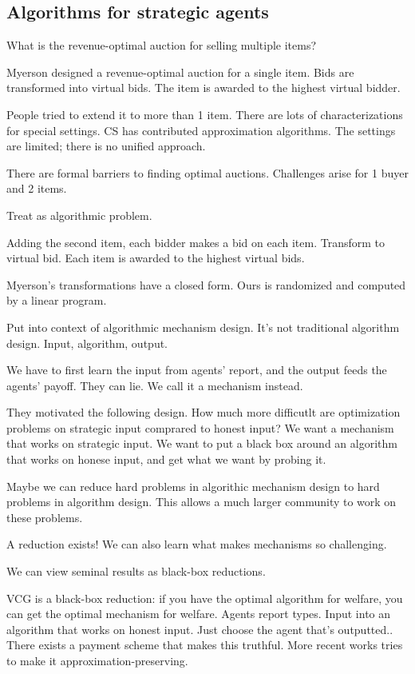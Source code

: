 \subsection{Algorithms for strategic agents}

What is the revenue-optimal auction for selling multiple items?

Myerson designed a revenue-optimal auction for a single item. Bids are transformed into virtual bids. The item is awarded to the highest virtual bidder.

People tried to extend it to more than 1 item. There are lots of characterizations for special settings. CS has contributed approximation algorithms. The settings are limited; there is no unified approach.

There are formal barriers to %
finding optimal auctions. %
Challenges arise for 1 buyer and 2 items.

Treat as algorithmic problem.

Adding the second item, each bidder makes a bid on each item. Transform to virtual bid. Each item is awarded to the highest virtual bids.

Myerson's transformations have a closed form. Ours is randomized and computed by a linear program.

Put into context of algorithmic mechanism design. It's not traditional algorithm design. Input, algorithm, output.

We have to first learn the input from agents' report, and the output feeds the agents' payoff. They can lie. We call it a mechanism instead.

They motivated the following design. How much more difficutlt are optimization problems on strategic input comprared to honest input? We want a mechanism that works on strategic input. We want to put a black box around an algorithm that works on honese input, and get what we want by probing it.

Maybe we can reduce hard problems in algorithic mechanism design to hard problems in algorithm design. This allows a much larger community to work on these problems.

A reduction exists! We can also learn what makes mechanisms so challenging.

We can view seminal results as black-box reductions.

VCG is a black-box reduction: if you have the optimal algorithm for welfare, you can get the optimal mechanism for welfare. 
Agents report types. Input into an algorithm that works on honest input. Just choose the agent that's outputted.. There exists a payment scheme that makes this truthful. More recent works tries to make it approximation-preserving.

